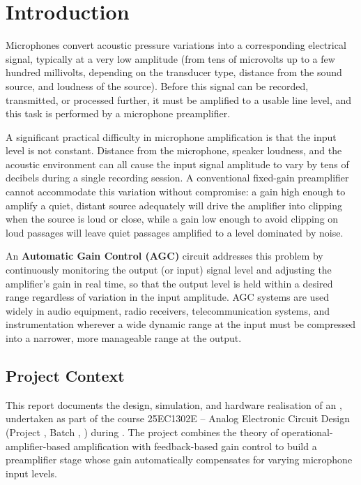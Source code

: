 \chapter{Introduction}
\label{ch:introduction}

Microphones convert acoustic pressure variations into a corresponding electrical signal, typically at a very low amplitude (from tens of microvolts up to a few hundred millivolts, depending on the transducer type, distance from the sound source, and loudness of the source). Before this signal can be recorded, transmitted, or processed further, it must be amplified to a usable line level, and this task is performed by a microphone preamplifier.

A significant practical difficulty in microphone amplification is that the input level is not constant. Distance from the microphone, speaker loudness, and the acoustic environment can all cause the input signal amplitude to vary by tens of decibels during a single recording session. A conventional fixed-gain preamplifier cannot accommodate this variation without compromise: a gain high enough to amplify a quiet, distant source adequately will drive the amplifier into clipping when the source is loud or close, while a gain low enough to avoid clipping on loud passages will leave quiet passages amplified to a level dominated by noise.

An \textbf{Automatic Gain Control (AGC)} circuit addresses this problem by continuously monitoring the output (or input) signal level and adjusting the amplifier's gain in real time, so that the output level is held within a desired range regardless of variation in the input amplitude. AGC systems are used widely in audio equipment, radio receivers, telecommunication systems, and instrumentation wherever a wide dynamic range at the input must be compressed into a narrower, more manageable range at the output.

\section{Project Context}

This report documents the design, simulation, and hardware realisation of an \projecttitle, undertaken as part of the course 25EC1302E -- Analog Electronic Circuit Design (Project \projectid, Batch \batchnumber, \comapping) during \academicyear. The project combines the theory of operational-amplifier-based amplification with feedback-based gain control to build a preamplifier stage whose gain automatically compensates for varying microphone input levels.

